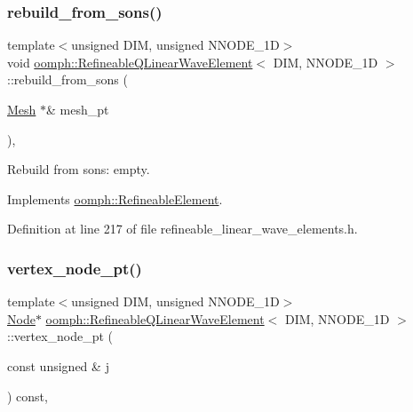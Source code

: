 \subsubsection{\texorpdfstring{rebuild\+\_\+from\+\_\+sons()}{rebuild\_from\_sons()}}
{\footnotesize\ttfamily template$<$unsigned D\+IM, unsigned N\+N\+O\+D\+E\+\_\+1D$>$ \\
void \hyperlink{classoomph_1_1RefineableQLinearWaveElement}{oomph\+::\+Refineable\+Q\+Linear\+Wave\+Element}$<$ D\+IM, N\+N\+O\+D\+E\+\_\+1D $>$\+::rebuild\+\_\+from\+\_\+sons (\begin{DoxyParamCaption}\item[{\hyperlink{classoomph_1_1Mesh}{Mesh} $\ast$\&}]{mesh\+\_\+pt }\end{DoxyParamCaption})\hspace{0.3cm}{\ttfamily [inline]}, {\ttfamily [virtual]}}



Rebuild from sons\+: empty. 



Implements \hyperlink{classoomph_1_1RefineableElement_a33324be27833fa4b78279d17158215fa}{oomph\+::\+Refineable\+Element}.



Definition at line 217 of file refineable\+\_\+linear\+\_\+wave\+\_\+elements.\+h.

\mbox{\label{classoomph_1_1RefineableQLinearWaveElement_ae459213712a5be1584dc3ed02d3991ec}} 
\subsubsection{\texorpdfstring{vertex\+\_\+node\+\_\+pt()}{vertex\_node\_pt()}}
{\footnotesize\ttfamily template$<$unsigned D\+IM, unsigned N\+N\+O\+D\+E\+\_\+1D$>$ \\
\hyperlink{classoomph_1_1Node}{Node}$\ast$ \hyperlink{classoomph_1_1RefineableQLinearWaveElement}{oomph\+::\+Refineable\+Q\+Linear\+Wave\+Element}$<$ D\+IM, N\+N\+O\+D\+E\+\_\+1D $>$\+::vertex\+\_\+node\+\_\+pt (\begin{DoxyParamCaption}\item[{const unsigned \&}]{j }\end{DoxyParamCaption}) const\hspace{0.3cm}{\ttfamily [inline]}, {\ttfamily [virtual]}}



